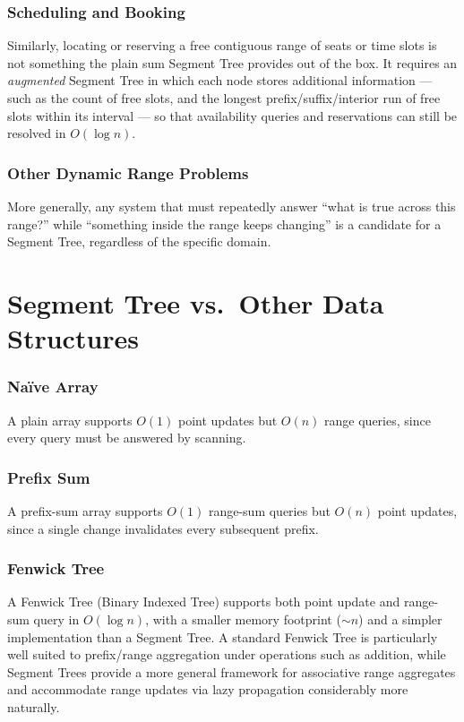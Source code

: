\documentclass[11pt,open=any,headings=option]{scrreprt}
\begin{document}
\subsection{Scheduling and Booking}
Similarly, locating or reserving a free contiguous range of seats or time slots is not something the plain sum Segment Tree provides out of the box. It requires an \emph{augmented} Segment Tree in which each node stores additional information --- such as the count of free slots, and the longest prefix/suffix/interior run of free slots within its interval --- so that availability queries and reservations can still be resolved in $O(\log n)$.

\subsection{Other Dynamic Range Problems}
More generally, any system that must repeatedly answer ``what is true across this range?'' while ``something inside the range keeps changing'' is a candidate for a Segment Tree, regardless of the specific domain.

\chapter{Segment Tree vs.\ Other Data Structures}

\subsection{Na\"ive Array}
A plain array supports $O(1)$ point updates but $O(n)$ range queries, since every query must be answered by scanning.

\subsection{Prefix Sum}
A prefix-sum array supports $O(1)$ range-sum queries but $O(n)$ point updates, since a single change invalidates every subsequent prefix.

\subsection{Fenwick Tree}
A Fenwick Tree (Binary Indexed Tree) supports both point update and range-sum query in $O(\log n)$, with a smaller memory footprint ($\sim n$) and a simpler implementation than a Segment Tree. A standard Fenwick Tree is particularly well suited to prefix/range aggregation under operations such as addition, while Segment Trees provide a more general framework for associative range aggregates and accommodate range updates via lazy propagation considerably more naturally.
\end{document}
